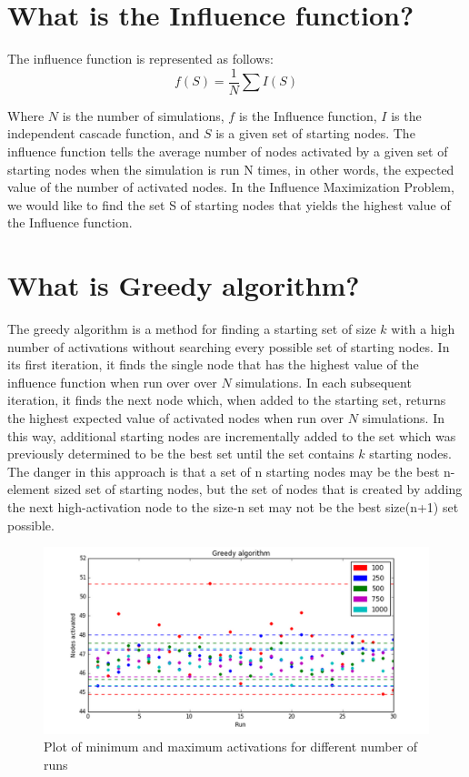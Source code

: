 \documentclass[11pt]{scrartcl} %
\begin{document}
\section{What is the Influence function?}

The influence function is represented as follows:
\begin{equation}
f(S) = \frac{1}{N} \sum I(S)
\end{equation}

Where $N$ is the number of simulations, $f$ is the Influence function, $I$ is the independent cascade function, and $S$ is a given set of starting nodes.  The influence function tells the average number of nodes activated by a given set of starting nodes when the simulation is run N times, in other words, the expected value of the number of activated nodes.  In the Influence Maximization Problem, we would like to find the set S of starting nodes that yields the highest value of the Influence function.    


\section{What is Greedy algorithm?}

The greedy algorithm is a method for finding a starting set of size $k$ with a high number of activations without searching every possible set of starting nodes.  In its first iteration, it finds the single node that has the highest value of the influence function when run over over $N$ simulations.  In each subsequent iteration, it finds the next node which, when added to the starting set, returns the highest expected value of activated nodes when run over $N$ simulations.  In this way, additional starting nodes are incrementally added to the set which was previously determined to be the best set until the set contains $k$ starting nodes.\\ 
	
The danger in this approach is that a set of n starting nodes may be the best n-element sized set of starting nodes, but the set of nodes that is created by adding the next high-activation node to the size-n set may not be the best size(n+1) set possible.  

\begin{figure}[h!]
\centering
\includegraphics[width=15 cm]{greedy_min}
\caption{Plot of minimum and maximum activations for different number of runs}
\label{fig:GA}
\end{figure}
\end{document}
